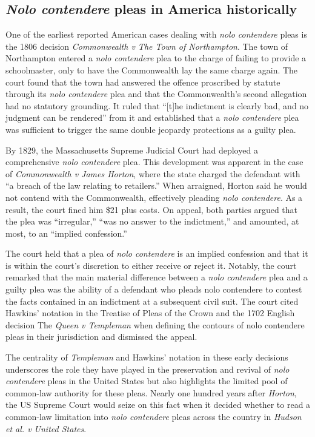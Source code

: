 \subsection{\textit{Nolo contendere} pleas in America historically}
One of the earliest reported American cases dealing with \textit{nolo contendere} pleas is the 1806 decision \textit{Commonwealth v The Town of Northampton}. The town of Northampton entered a \textit{nolo contendere} plea to the charge of failing to provide a schoolmaster, only to have the Commonwealth lay the same charge again. The court found that the town had answered the offence proscribed by statute through its \textit{nolo contendere} plea and that the Commonwealth's second allegation had no statutory grounding. It ruled that ``[t]he indictment is clearly bad, and no judgment can be rendered'' from it and established that a \textit{nolo contendere} plea was sufficient to trigger the same double jeopardy protections as a guilty plea.

By 1829, the Massachusetts Supreme Judicial Court had deployed a comprehensive \textit{nolo contendere} plea. This development was apparent in the case of \textit{Commonwealth v James Horton}, where the state charged the defendant with ``a breach of the law relating to retailers.'' When arraigned, Horton said he would not contend with the Commonwealth, effectively pleading \textit{nolo contendere}. As a result, the court fined him \$21 plus costs. On appeal, both parties argued that the plea was ``irregular,'' ``was no answer to the indictment,'' and amounted, at most, to an ``implied confession.''

The court held that a plea of \textit{nolo contendere} is an implied confession and that it is within the court's discretion to either receive or reject it. Notably, the court remarked that the main material difference between a \textit{nolo contendere} plea and a guilty plea was the ability of a defendant who pleads nolo contendere to contest the facts contained in an indictment at a subsequent civil suit. The court cited Hawkins' notation in the Treatise of Pleas of the Crown and the 1702 English decision The \textit{Queen v Templeman} when defining the contours of nolo contendere pleas in their jurisdiction and dismissed the appeal.

The centrality of \textit{Templeman} and Hawkins' notation in these early decisions underscores the role they have played in the preservation and revival of \textit{nolo contendere} pleas in the United States but also highlights the limited pool of common-law authority for these pleas. Nearly one hundred years after \textit{Horton}, the US Supreme Court would seize on this fact when it decided whether to read a common-law limitation into \textit{nolo contendere} pleas across the country in \textit{Hudson et al. v United States}.

